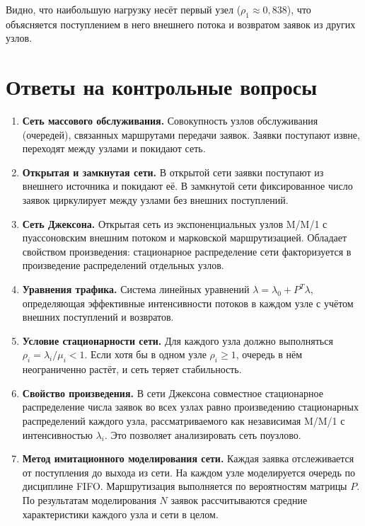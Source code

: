 Видно, что наибольшую нагрузку несёт первый узел ($\rho_1 \approx 0{,}838$), что объясняется поступлением в него внешнего потока и возвратом заявок из других узлов.

\section*{Ответы на контрольные вопросы}

\begin{enumerate}
    \item \textbf{Сеть массового обслуживания.} Совокупность узлов обслуживания (очередей), связанных маршрутами передачи заявок. Заявки поступают извне, переходят между узлами и покидают сеть.
    \item \textbf{Открытая и замкнутая сети.} В открытой сети заявки поступают из внешнего источника и покидают её. В замкнутой сети фиксированное число заявок циркулирует между узлами без внешних поступлений.
    \item \textbf{Сеть Джексона.} Открытая сеть из экспоненциальных узлов M/M/1 с пуассоновским внешним потоком и марковской маршрутизацией. Обладает свойством произведения: стационарное распределение сети факторизуется в произведение распределений отдельных узлов.
    \item \textbf{Уравнения трафика.} Система линейных уравнений $\lambda = \lambda_0 + P^T\lambda$, определяющая эффективные интенсивности потоков в каждом узле с учётом внешних поступлений и возвратов.
    \item \textbf{Условие стационарности сети.} Для каждого узла должно выполняться $\rho_i = \lambda_i/\mu_i < 1$. Если хотя бы в одном узле $\rho_i \ge 1$, очередь в нём неограниченно растёт, и сеть теряет стабильность.
    \item \textbf{Свойство произведения.} В сети Джексона совместное стационарное распределение числа заявок во всех узлах равно произведению стационарных распределений каждого узла, рассматриваемого как независимая M/M/1 с интенсивностью $\lambda_i$. Это позволяет анализировать сеть поузлово.
    \item \textbf{Метод имитационного моделирования сети.} Каждая заявка отслеживается от поступления до выхода из сети. На каждом узле моделируется очередь по дисциплине FIFO. Маршрутизация выполняется по вероятностям матрицы $P$. По результатам моделирования $N$ заявок рассчитываются средние характеристики каждого узла и сети в целом.
\end{enumerate}

